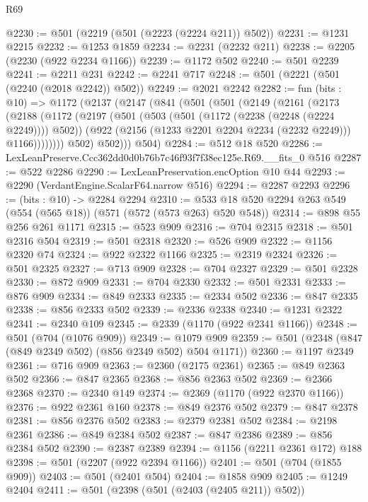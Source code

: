 \begin{lexlean}{R69}
\begin{coremodule}
@2230 := @501 (@2219 (@501 (@2223 (@2224 @211)) @502))
@2231 := @1231 @2215
@2232 := @1253 @1859
@2234 := @2231 (@2232 @211)
@2238 := @2205 (@2230 (@922 @2234 @1166))
@2239 := @1172 @502
@2240 := @501 @2239
@2241 := @2211 @231
@2242 := @2241 @717
@2248 := @501 (@2221 (@501 (@2240 (@2018 @2242)) @502))
@2249 := @2021 @2242
@2282 := fun (bits : @10) =>
  @1172
    (@2137
      (@2147
        (@841
          (@501
            (@501
              (@2149
                (@2161
                  (@2173
                    (@2188
                      (@1172
                        (@2197
                          (@501
                            (@503 (@501 (@1172 (@2238 (@2248 (@2224 @2249)))) @502))
                            (@922 (@2156 (@1233 @2201 @2204 @2234 (@2232 @2249))) @1166))))))))
              @502)
            @502)))
      @504)
@2284 := @512 @18 @520
@2286 := LexLeanPreserve.Ccc362dd0d0b76b7c46f93f7f38ec125e.R69.__fits_0 @516
@2287 := @522 @2286
@2290 := LexLeanPreservation.encOption @10 @44
@2293 := @2290 (VerdantEngine.ScalarF64.narrow @516)
@2294 := @2287 @2293
@2296 := (bits : @10) -> @2284 @2294
@2310 := @533 @18 @520 @2294 @263 @549 (@554 (@565 @18)) (@571 (@572 (@573 @263) @520 @548))
@2314 := @898 @55 @256 @261 @1171
@2315 := @523 @909
@2316 := @704 @2315
@2318 := @501 @2316 @504
@2319 := @501 @2318
@2320 := @526 @909
@2322 := @1156 @2320 @74
@2324 := @922 @2322 @1166
@2325 := @2319 @2324
@2326 := @501 @2325
@2327 := @713 @909
@2328 := @704 @2327
@2329 := @501 @2328
@2330 := @872 @909
@2331 := @704 @2330
@2332 := @501 @2331
@2333 := @876 @909
@2334 := @849 @2333
@2335 := @2334 @502
@2336 := @847 @2335
@2338 := @856 @2333 @502
@2339 := @2336 @2338
@2340 := @1231 @2322
@2341 := @2340 @109
@2345 := @2339 (@1170 (@922 @2341 @1166))
@2348 := @501 (@704 (@1076 @909))
@2349 := @1079 @909
@2359 := @501 (@2348 (@847 (@849 @2349 @502) (@856 @2349 @502) @504 @1171))
@2360 := @1197 @2349
@2361 := @716 @909
@2363 := @2360 (@2175 @2361)
@2365 := @849 @2363 @502
@2366 := @847 @2365
@2368 := @856 @2363 @502
@2369 := @2366 @2368
@2370 := @2340 @149
@2374 := @2369 (@1170 (@922 @2370 @1166))
@2376 := @922 @2361 @160
@2378 := @849 @2376 @502
@2379 := @847 @2378
@2381 := @856 @2376 @502
@2383 := @2379 @2381 @502
@2384 := @2198 @2361
@2386 := @849 @2384 @502
@2387 := @847 @2386
@2389 := @856 @2384 @502
@2390 := @2387 @2389
@2394 := @1156 (@2211 @2361 @172) @188
@2398 := @501 (@2207 (@922 @2394 @1166))
@2401 := @501 (@704 (@1855 @909))
@2403 := @501 (@2401 @504)
@2404 := @1858 @909
@2405 := @1249 @2404
@2411 := @501 (@2398 (@501 (@2403 (@2405 @211)) @502))

\end{coremodule}
\end{lexlean}
